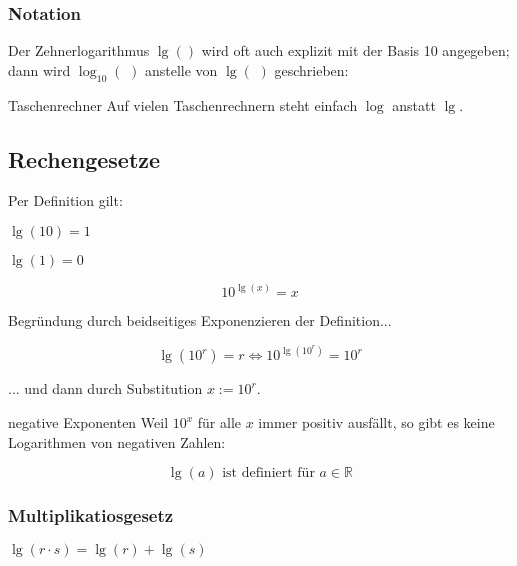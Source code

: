 \subsubsection{Notation}
Der Zehnerlogarithmus $\lg()$ wird oft auch explizit mit der Basis 10
angegeben; dann wird $\log_{10}(\,\,)$ anstelle von $\lg(\,\,)$ geschrieben:

\begin{center}
\end{center}

\begin{bemerkung}{Taschenrechner}{}
  Auf vielen Taschenrechnern steht einfach $\log$ anstatt $\lg$.

  \end{bemerkung}
\newpage

\subsection{Rechengesetze}
Per Definition gilt:

\begin{gesetz}{}{}
$\lg(10) = 1$
\end{gesetz}

\begin{gesetz}{}{}
$\lg(1) = 0$
\end{gesetz}

\begin{gesetz}{}{}
  $$10^{\lg(x)} = x$$
\end{gesetz}
Begründung durch beidseitiges Exponenzieren der Definition...

$$\lg(10^r) = r \Longleftrightarrow 10^{\lg(10^r)} = 10^r$$

... und dann durch Substitution $x := 10^r$.

\begin{bemerkung}{negative Exponenten}{}
  Weil $10^x$ für alle $x$ immer positiv ausfällt, so gibt es keine
  Logarithmen von negativen Zahlen:

  $$\lg(a) \textrm{ ist definiert für } a\in\mathbb{R}$$
  \end{bemerkung}


\newpage
\subsubsection{Multiplikatiosgesetz}
\begin{gesetz}{}{}
  $\lg(r\cdot s) = \lg(r) + \lg(s)$
\end{gesetz}

